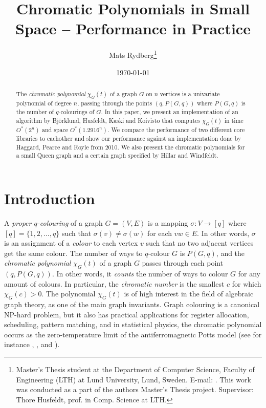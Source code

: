 \documentclass[a4paper]{article}
\title{\huge{Chromatic Polynomials in Small Space -- Performance in Practice}}
\author{Mats Rydberg\thanks{Master's Thesis student at the Department of Computer Science, Faculty of Engineering (LTH) at Lund University, Lund, Sweden. E-mail: \code{dt08mr7@student.lth.se}. This work was conducted as a part of the authors Master's Thesis project. Supervisor: Thore Husfeldt, prof. in Comp. Science at LTH.}}
\date{\today}
\begin{document}
\maketitle

\begin{abstract}
The \emph{chromatic polynomial} $\chi_G(t)$ of a graph $G$ on $n$ vertices is a univariate polynomial of degree $n$, passing through the points $(q, P(G,q))$ where $P(G,q)$ is the number of $q$-colourings of $G$. In this paper, we present an implementation of an algorithm by Björklund, Husfeldt, Kaski and Koivisto that computes $\chi_G(t)$ in time $O^*(2^n)$ and space $O^*(1.2916^n)$. We compare the performance of two different core libraries to eachother and show our performance against an implementation done by Haggard, Pearce and Royle from 2010. 
We also present the chromatic polynomials for a small Queen graph and a certain graph specified by Hillar and Windfeldt.
\end{abstract}

\newpage

\section{Introduction}

A \emph{proper $q$-colouring} of a graph $G = (V, E)$ is a mapping $\sigma: V \rightarrow [q]$ where $[q] = \{1,2,\ldots,q\}$ such that $\sigma(v) \neq \sigma(w)$ for each $vw \in E$. In other words, $\sigma$ is an assignment of a \emph{colour} to each vertex $v$ such that no two adjacent vertices get the same colour.
The number of ways to $q$-colour $G$ is $P(G,q)$, and the \emph{chromatic polynomial} $\chi_G(t)$ of a graph $G$ passes through each point $(q, P(G,q))$. In other words, it \emph{counts} the number of ways to colour $G$ for any amount of colours.
In particular, the \emph{chromatic number} is the smallest $c$ for which $\chi_G(c) > 0$. The polynomial $\chi_G(t)$ is of high interest in the field of algebraic graph theory, as one of the main graph invariants. Graph colouring is a canonical NP-hard problem, but it also has practical applications for register allocation, scheduling, pattern matching, and in statistical physics, the chromatic polynomial occurs as the zero-temperature limit of the antiferromagnetic Potts model (see for instance \cite{chaitin}, \cite{marx}, and \cite{pottsmodel}).
\end{document}
